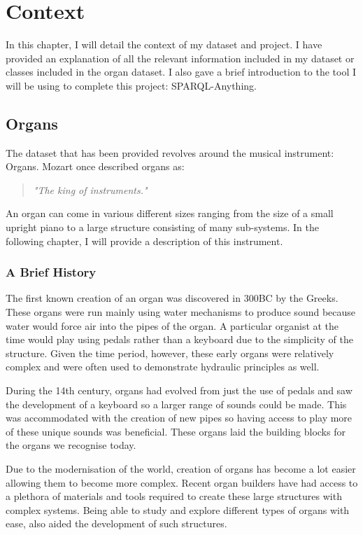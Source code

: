 \chapter{Context}
In this chapter, I will detail the context of my dataset and project. I have provided an explanation of all the relevant information included in my dataset or classes included in the organ dataset. I also gave a brief introduction to the tool I will be using to complete this project: SPARQL-Anything. 

\section{Organs}
\hspace{0.5cm} The dataset that has been provided revolves around the musical instrument: Organs. Mozart once described organs as:

\begin{quote}
    \textit{"The king of instruments."}
\end{quote}

An organ can come in various different sizes ranging from the size of a small upright piano to a large structure consisting of many sub-systems. In the following chapter, I will provide a description of this instrument.

\subsection{A Brief History}
\hspace{0.5cm} The first known creation of an organ was discovered in 300BC by the Greeks. These organs were run mainly using water mechanisms to produce sound because water would force air into the pipes of the organ. A particular organist at the time would play using pedals rather than a keyboard due to the simplicity of the structure. Given the time period, however, these early organs were relatively complex and were often used to demonstrate hydraulic principles as well. \cite{organhistory}

During the 14th century, organs had evolved from just the use of pedals and saw the development of a keyboard so a larger range of sounds could be made. This was accommodated with the creation of new pipes so having access to play more of these unique sounds was beneficial. These organs laid the building blocks for the organs we recognise today. \cite{organmedivalhistory}

Due to the modernisation of the world, creation of organs has become a lot easier allowing them to become more complex. Recent organ builders have had access to a plethora of materials and tools required to create these large structures with complex systems. Being able to study and explore different types of organs with ease, also aided the development of such structures.  \cite{organhistory}

